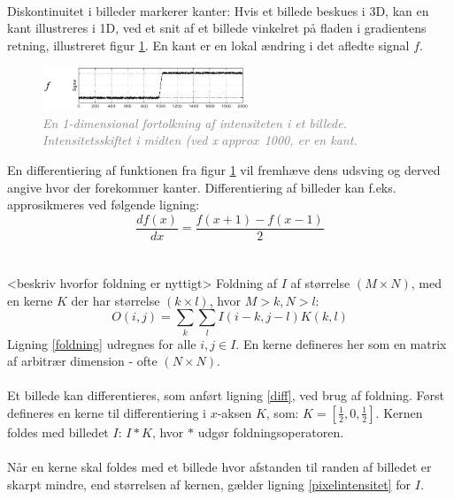 \\
Diskontinuitet i billeder markerer kanter: Hvis et billede beskues i 3D, kan en kant illustreres i 1D, ved et snit af et billede vinkelret på fladen i gradientens retning, illustreret figur \ref{fig:kant}. En kant er en lokal ændring i det afledte signal $f$.
\noindent
\begin{figure}[H]
    \centering
    \includegraphics[width=0.55\textwidth]{fig/7.png}
     \vspace{-1em}
    \begin{center}        
     \caption{\textcolor{gray}{\footnotesize \textit{
En 1-dimensional fortolkning af intensiteten i et billede. Intensitetsskiftet i midten (ved x $approx$ 1000, er en kant.}}}
    \label{fig:kant}
     \end{center}
       \vspace{-2.5em}
  \end{figure}
\noindent
En differentiering af funktionen fra figur \ref{fig:kant} vil fremhæve dens udsving og derved angive hvor der forekommer kanter. Differentiering af billeder kan f.eks. approsikmeres ved følgende ligning:
\begin{equation}
\dfrac{df(x)}{dx}=\dfrac{f(x+1)-f(x-1)}{2}
\label{diff}
\end{equation}
\\
\\
<beskriv hvorfor foldning er nyttigt>
Foldning af $I$ af størrelse $(M \times N)$, med en kerne $K$ der har størrelse $(k \times l)$, hvor $M > k, N > l$:
\begin{equation}
O(i,j) = \sum_{k} \sum_{l} I(i-k, j-l) K(k,l)
\label{foldning}
\end{equation}
Ligning \eqref{foldning} udregnes for alle $i,j \in I$. En kerne defineres her som en matrix af arbitrær dimension - ofte $(N\times N)$. 
\\
\\
Et billede kan differentieres, som anført ligning \eqref{diff}, ved brug af foldning. Først defineres en kerne til differentiering i $x$-aksen $K$, som: $K = [\frac{1}{2}, 0, \frac{1}{2}]$. Kernen foldes med billedet $I$: $I \ast K $, hvor $\ast$ udgør foldningsoperatoren.
\\
\\
Når en kerne skal foldes med et billede hvor afstanden til randen af billedet er skarpt mindre, end størrelsen af kernen, gælder ligning \eqref{pixelintensitet} for $I$.
